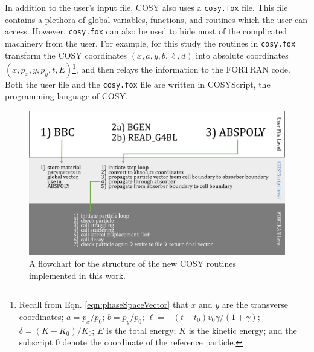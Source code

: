 In addition to the user's input file, COSY also uses a \texttt{cosy.fox} file. This file contains a plethora of global variables, functions, and routines which the user can access. However, \texttt{cosy.fox} can also be used to hide most of the complicated machinery from the user. For example, for this study the routines in \texttt{cosy.fox} transform the COSY coordinates $(x, a, y, b, \ell, d)$ into absolute coordinates $(x, p_x, y, p_y, t, E)$\footnote{Recall from Eqn. \ref{eqn:phaseSpaceVector} that $x$ and $y$ are the transverse coordinates; $a=p_x/p_0$; $b=p_y/p_0$; $\ell=-(t-t_0)v_0\gamma/(1+\gamma)$; $\delta=(K-K_0)/K_0$; $E$ is the total energy; $K$ is the kinetic energy; and the subscript $0$ denote the coordinate of the reference particle.}, and then relays the information to the FORTRAN code. Both the user file and the \texttt{cosy.fox} file are written in COSYScript, the programming language of COSY. 

\begin{figure}[!htb]
  \centering
    \includegraphics[width=\textwidth]{Figures/cosy_flowchart} 
  \caption{A flowchart for the structure of the new COSY routines implemented in this work.}
  \label{fig:cosy_flowchart}
\end{figure}

